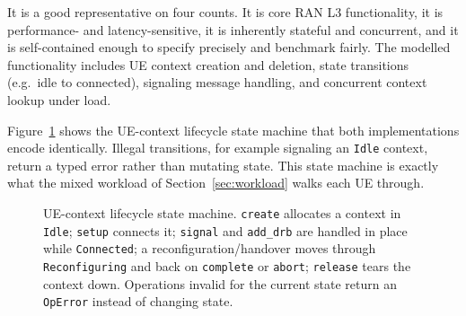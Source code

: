 \documentclass[english,twoside,openright,a4paper,censored,csm,software-track-2020]{HYthesisML}
\begin{document}
It is a good representative on four counts. It is core RAN L3 functionality, it is performance-
and latency-sensitive, it is inherently stateful and concurrent, and it is self-contained
enough to specify precisely and benchmark fairly. The modelled functionality includes UE
context creation and deletion, state transitions (e.g.\ idle to connected), signaling
message handling, and concurrent context lookup under load.

Figure~\ref{fig:fsm} shows the UE-context lifecycle state machine that both implementations
encode identically. Illegal transitions, for example signaling an \texttt{Idle} context, return
a typed error rather than mutating state. This state machine is exactly what the mixed workload
of Section~\ref{sec:workload} walks each UE through.

\begin{figure}
\centering
{}
\caption[UE-context lifecycle state machine]{UE-context lifecycle state machine. \texttt{create} allocates a context in
\texttt{Idle}; \texttt{setup} connects it; \texttt{signal} and \texttt{add\_drb} are handled
in place while \texttt{Connected}; a reconfiguration/handover moves through
\texttt{Reconfiguring} and back on \texttt{complete} or \texttt{abort}; \texttt{release}
tears the context down. Operations invalid for the current state return an \texttt{OpError}
instead of changing state.\label{fig:fsm}}
\end{figure}
\end{document}
